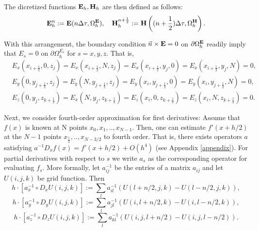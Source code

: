 \documentclass[12pt,reqno]{amsart}
\newcommand{\e}{{\bf E}}
\newcommand{\h}{{\bf H}}
\theoremstyle{definition}
\numberwithin{equation}{section}
\def\Gwh{\Omega_h}
\begin{document}
    The dicretized functions $\e_h, \h_h$ are then defined as follows:
    $$
    \e_h^n:=\e(n\Delta \tau,\Gwh^\e),\quad  \h_h^{n+\frac{1}{2}}:=\h\left ((n+\frac{1}{2})\Delta \tau,\Gwh^\h\right).
    $$

	With this arrangement, the boundary condition 
	$\vec{n}\times {\bf E}=0$ on $\partial \Gwh^{{\bf E}}$ readily imply that 
	$E_s=0$ on $\partial \Gwh^{E_s}$ for $s=x,y,z$. That is, 
	\begin{align*}
		&
		E_x(x_{i+\frac{1}{2}},0,z_j)=E_x(x_{i+\frac{1}{2}},N,z_j)=
		E_x(x_{i+\frac{1}{2}},y_j,0)=E_x(x_{i+\frac{1}{2}},y_j, N)=0, \\&
		E_y(0,y_{j+\frac{1}{2}},z_j)=E_y(N,y_{j+\frac{1}{2}},z_j)=
		E_y(x_i,y_{j+\frac{1}{2}},0)=E_y(x_i, y_{j+\frac{1}{2}}, N)=0, \\&
		E_z(0,y_j,z_{k+\frac{1}{2}})=E_x(N,y_j,z_{k+\frac{1}{2}})=
		E_z(x_i,0,z_{k+\frac{1}{2}})=E_z(x_i,N,z_{k+\frac{1}{2}})=0. &
	\end{align*} 

	Next, we consider fourth-order approximation for first derivatives:
	Assume that $f(x)$ is known at N points $x_0,x_1, ..,x_{N-1}$. Then,  one can  estimate  $f'(x+h/2)$ at the $N-1$ points 	$x_{\frac{1}{2}},..,x_{N-3/2}$ to fourth order.
   That is, there exists operators $a$ satisfying $a^{-1}D_xf(x)=f'(x+h/2)+O(h^4)$
   (see Appendix \ref{appendix}). For partial derivatives with respect to $s$ we write $a_s$ as the corresponding operator for evaluating $f_s$. 
   More formally, let $a_{ij}^{-1}$ be the entries of a matrix $a_{ij}$ and let $U(i,j,k)$ be grid function.
   Then 
 $$h\cdot [a_x^{-1}\circ D_xU(i,j,k)]:=\sum_{l} a_{il}^{-1}(U(l+n/2,j,k)-U(l-n/2,j,k)),$$
  $$h\cdot [a_y^{-1}\circ D_yU(i,j,k)]:=\sum_{l} a_{jl}^{-1}(U(i,l+n/2,k)-U(i,l-n/2,k)),$$
   $$h\cdot [a_z^{-1}\circ D_zU(i,j,k)]:=\sum_{l} a_{kl}^{-1}(U(i,j,l+n/2)-U(i,j,l-n/2)).$$
\end{document}
